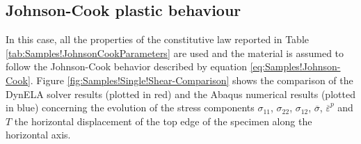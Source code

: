 \subsection{Johnson-Cook plastic behaviour}

In this case, all the properties of the constitutive law reported
in Table \ref{tab:Samples!JohnsonCookParameters} are used and the
material is assumed to follow the Johnson-Cook behavior described
by equation \ref{eq:Samples!Johnson-Cook}. Figure \ref{fig:Samples!Single!Shear-Comparison}
shows the comparison of the DynELA solver results (plotted in red)
and the Abaqus numerical results (plotted in blue) concerning the
evolution of the stress components $\sigma_{11}$, $\sigma_{22}$,
$\sigma_{12}$, $\overline{\sigma}$, $\overline{\varepsilon}^{p}$
and $T$ \versus  the horizontal displacement of the top edge of
the specimen along the horizontal axis.

